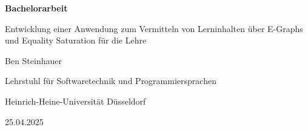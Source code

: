 \begin{frame}
    \thispagestyle{empty}
    \centering

    {\bf\color{black} Bachelorarbeit}\vspace{4mm}

    {\color{hhuUniBlau}\large Entwicklung einer Anwendung zum Vermitteln von Lerninhalten über E-Graphs und Equality Saturation für die Lehre}\vspace{4mm}

    {\color{hhuUniBlau} Ben Steinhauer}\vspace{3mm}

    {\footnotesize Lehrstuhl für Softwaretechnik und Programmiersprachen}\vspace{-1mm}

    {\footnotesize Heinrich-Heine-Universität Düsseldorf}\vspace{4mm}

    {\footnotesize 25.04.2025}

\end{frame}